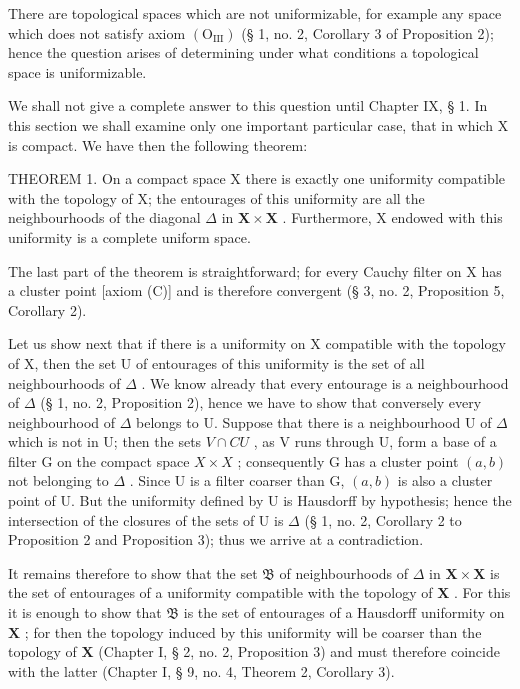 There are topological spaces which are not uniformizable, for example any space which does not satisfy axiom \((\mathrm{O}_{\mathrm{III}})\) (§ 1, no. 2, Corollary 3 of Proposition 2); hence the question arises of determining under what conditions a topological space is uniformizable.

We shall not give a complete answer to this question until Chapter IX, § 1. In this section we shall examine only one important particular case, that in which X is compact. We have then the following theorem:

THEOREM 1. On a compact space X there is exactly one uniformity compatible with the topology of X; the entourages of this uniformity are all the neighbourhoods of the diagonal \(\Delta\) in \(\mathbf{X} \times \mathbf{X}\) . Furthermore, X endowed with this uniformity is a complete uniform space.

The last part of the theorem is straightforward; for every Cauchy filter on X has a cluster point {[}axiom (C){]} and is therefore convergent (§ 3, no. 2, Proposition 5, Corollary 2).

Let us show next that if there is a uniformity on X compatible with the topology of X, then the set U of entourages of this uniformity is the set of all neighbourhoods of \(\Delta\) . We know already that every entourage is a neighbourhood of \(\Delta\) (§ 1, no. 2, Proposition 2), hence we have to show that conversely every neighbourhood of \(\Delta\) belongs to U. Suppose that there is a neighbourhood U of \(\Delta\) which is not in U; then the sets \(V \cap CU\) , as V runs through U, form a base of a filter G on the compact space \(X \times X\) ; consequently G has a cluster point \((a, b)\) not belonging to \(\Delta\) . Since U is a filter coarser than G, \((a, b)\) is also a cluster point of U. But the uniformity defined by U is Hausdorff by hypothesis; hence the intersection of the closures of the sets of U is \(\Delta\) (§ 1, no. 2, Corollary 2 to Proposition 2 and Proposition 3); thus we arrive at a contradiction.

It remains therefore to show that the set \(\mathfrak{B}\) of neighbourhoods of \(\Delta\) in \(\mathbf{X} \times \mathbf{X}\) is the set of entourages of a uniformity compatible with the topology of \(\mathbf{X}\) . For this it is enough to show that \(\mathfrak{B}\) is the set of entourages of a Hausdorff uniformity on \(\mathbf{X}\) ; for then the topology induced by this uniformity will be coarser than the topology of \(\mathbf{X}\) (Chapter I, § 2, no. 2, Proposition 3) and must therefore coincide with the latter (Chapter I, § 9, no. 4, Theorem 2, Corollary 3).

